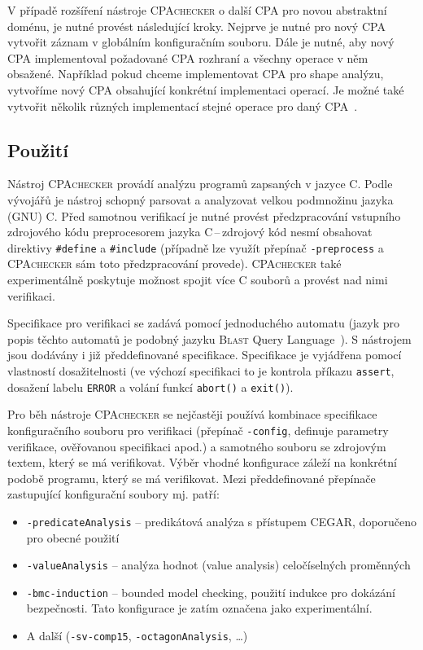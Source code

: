 \documentclass[a4paper,12pt]{article}
\begin{document}
V případě rozšíření nástroje \textsc{CPAchecker} o další CPA pro novou abstraktní doménu, je nutné provést následující
kroky. Nejprve je nutné pro nový CPA vytvořit záznam v globálním konfiguračním souboru. Dále je nutné, aby nový CPA 
implementoval požadované CPA rozhraní a všechny operace v něm obsažené. Například pokud chceme implementovat CPA
pro shape analýzu, vytvoříme nový CPA obsahující konkrétní implementaci operací. Je možné také vytvořit několik
různých implementací stejné operace pro daný CPA~\cite{cpa}.

\subsection{Použití}
Nástroj \textsc{CPAchecker} provádí analýzu programů zapsaných v jazyce C. Podle vývojářů je nástroj schopný parsovat
a analyzovat velkou podmnožinu jazyka (GNU) C. Před samotnou verifikací je nutné provést předzpracování vstupního zdrojového kódu 
preprocesorem jazyka C\,--\,zdrojový kód nesmí obsahovat direktivy \texttt{\#define} a \texttt{\#include} (případně lze využít 
přepínač \texttt{-preprocess} a \textsc{CPAchecker} sám toto předzpracování provede). \textsc{CPAchecker} také experimentálně
poskytuje možnost spojit více C souborů a provést nad nimi verifikaci.

Specifikace pro verifikaci se zadává pomocí jednoduchého automatu (jazyk pro popis těchto automatů je podobný jazyku \textsc{Blast} 
Query Language~\cite{bql}). S nástrojem jsou dodávány i již předdefinované specifikace.
Specifikace je vyjádřena pomocí vlastností dosažitelnosti (ve výchozí specifikaci to je kontrola příkazu \texttt{assert}, dosažení labelu \texttt{ERROR} a volání funkcí
\texttt{abort()} a \texttt{exit()}). 

Pro běh nástroje \textsc{CPAchecker} se nejčastěji používá kombinace specifikace konfiguračního souboru pro verifikaci (přepínač 
\texttt{-config}, definuje parametry verifikace, ověřovanou specifikaci apod.) a samotného souboru se zdrojovým textem, který se 
má verifikovat. Výběr vhodné konfigurace záleží na konkrétní podobě programu, který se má verifikovat.
Mezi předdefinované přepínače zastupující konfigurační soubory mj. patří:
\begin{itemize}
 \item \texttt{-predicateAnalysis} -- predikátová analýza s přístupem CEGAR, doporučeno pro obecné použití
 \item \texttt{-valueAnalysis} -- analýza hodnot (value analysis) celočíselných proměnných
 \item \texttt{-bmc-induction} -- bounded model checking, použití indukce pro dokázání bezpečnosti. Tato konfigurace
   je zatím označena jako experimentální.
 \item A další (\texttt{-sv-comp15}, \texttt{-octagonAnalysis},  \dots)
\end{itemize}
\end{document}
